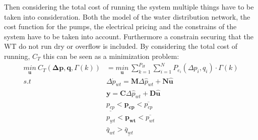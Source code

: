 Then considering the total cost of running the system multiple things have to be taken into consideration. Both the model of the water distribution network, the cost function for the pumps, the electrical pricing and the constrains of the system have to be taken into account. Furthermore a constrain securing that the WT do not run dry or overflow is included. By considering the total cost of running, $C_T$ this can be seen as a minimization problem:
\begin{align}
\underset{\pmb{u}}{min} \: C_T(\pmb{\Delta{p}},\pmb{q},\Gamma(k)) &= \underset{\pmb{u}}{min} \: \sum_{k=1}^{P_H} \sum_{i=1}^{N} P_{e_{i}}(\Delta{p}_i,q_i) \cdot \Gamma(k)  \\
%
s.t \:\:\:\:\: & \Delta \dot{p}_{wt} = \pmb{M} \Delta \hat{p}_{wt}  + \pmb{N}\pmb{\hat{u}} \\
%
&\pmb{y} = \pmb{C} \Delta \hat{p}_{wt}  + \pmb{D}\pmb{\hat{u}} \\
%
& \underline{p_{cp}} < \pmb{p_{cp}} < \overline{p_{cp}} \\
%
& \underline{p_{wt}} < \pmb{p_{wt}} < \overline{p_{wt}} \\
%
& \bar{q}_{wt} > \underline{\bar{q}_{wt}}
\end{align}

